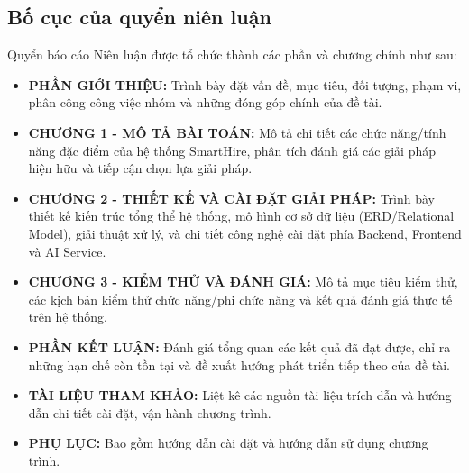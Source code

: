 \subsection{Bố cục của quyển niên luận}
Quyển báo cáo Niên luận được tổ chức thành các phần và chương chính như sau:
\begin{itemize}
    \item \textbf{PHẦN GIỚI THIỆU:} Trình bày đặt vấn đề, mục tiêu, đối tượng, phạm vi, phân công công việc nhóm và những đóng góp chính của đề tài.
    \item \textbf{CHƯƠNG 1 - MÔ TẢ BÀI TOÁN:} Mô tả chi tiết các chức năng/tính năng đặc điểm của hệ thống SmartHire, phân tích đánh giá các giải pháp hiện hữu và tiếp cận chọn lựa giải pháp.
    \item \textbf{CHƯƠNG 2 - THIẾT KẾ VÀ CÀI ĐẶT GIẢI PHÁP:} Trình bày thiết kế kiến trúc tổng thể hệ thống, mô hình cơ sở dữ liệu (ERD/Relational Model), giải thuật xử lý, và chi tiết công nghệ cài đặt phía Backend, Frontend và AI Service.
    \item \textbf{CHƯƠNG 3 - KIỂM THỬ VÀ ĐÁNH GIÁ:} Mô tả mục tiêu kiểm thử, các kịch bản kiểm thử chức năng/phi chức năng và kết quả đánh giá thực tế trên hệ thống.
    \item \textbf{PHẦN KẾT LUẬN:} Đánh giá tổng quan các kết quả đã đạt được, chỉ ra những hạn chế còn tồn tại và đề xuất hướng phát triển tiếp theo của đề tài.
    \item \textbf{TÀI LIỆU THAM KHẢO:} Liệt kê các nguồn tài liệu trích dẫn và hướng dẫn chi tiết cài đặt, vận hành chương trình.
    \item \textbf{PHỤ LỤC:} Bao gồm hướng dẫn cài đặt và hướng dẫn sử dụng chương trình.
\end{itemize}
\endgroup